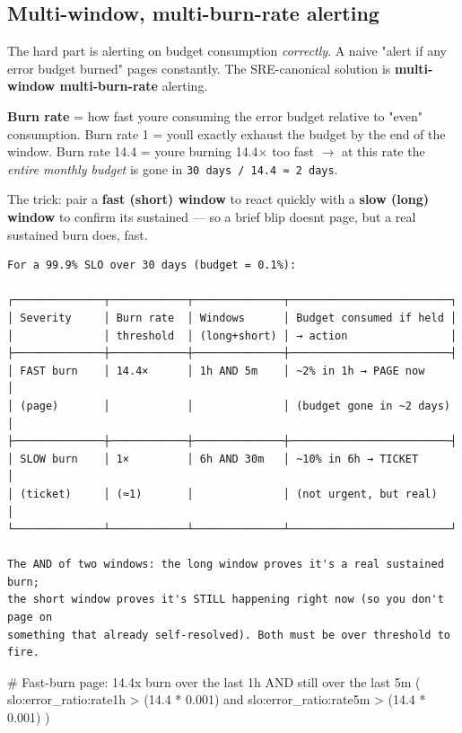 \documentclass[11pt]{article}
\newenvironment{Shaded}{\begin{snugshade}}{\end{snugshade}}
\newcommand{\NormalTok}[1]{\textcolor[rgb]{0.81,0.81,0.76}{#1}}
\begin{document}
\subsection{Multi-window, multi-burn-rate alerting}\label{multi-window-multi-burn-rate-alerting}

The hard part is alerting on budget consumption \emph{correctly}. A naive "alert if any error budget burned" pages constantly. The SRE-canonical solution is \textbf{multi-window multi-burn-rate} alerting.

\textbf{Burn rate} = how fast you\textquotesingle re consuming the error budget relative to "even" consumption. Burn rate 1 = you\textquotesingle ll exactly exhaust the budget by the end of the window. Burn rate 14.4 = you\textquotesingle re burning 14.4\(\times\) too fast \(\rightarrow\) at this rate the \emph{entire monthly budget} is gone in \texttt{30\ days\ /\ 14.4\ ≈\ 2\ days}.

The trick: pair a \textbf{fast (short) window} to react quickly with a \textbf{slow (long) window} to confirm it\textquotesingle s sustained --- so a brief blip doesn\textquotesingle t page, but a real sustained burn does, fast.

\setcodelang{}

\begin{verbatim}
For a 99.9% SLO over 30 days (budget = 0.1%):

┌──────────────┬────────────┬──────────────┬─────────────────────────┐
│ Severity     │ Burn rate  │ Windows      │ Budget consumed if held │
│              │ threshold  │ (long+short) │ → action                │
├──────────────┼────────────┼──────────────┼─────────────────────────┤
│ FAST burn    │ 14.4×      │ 1h AND 5m    │ ~2% in 1h → PAGE now     │
│ (page)       │            │              │ (budget gone in ~2 days) │
├──────────────┼────────────┼──────────────┼─────────────────────────┤
│ SLOW burn    │ 1×         │ 6h AND 30m   │ ~10% in 6h → TICKET      │
│ (ticket)     │ (≈1)       │              │ (not urgent, but real)   │
└──────────────┴────────────┴──────────────┴─────────────────────────┘

The AND of two windows: the long window proves it's a real sustained burn;
the short window proves it's STILL happening right now (so you don't page on
something that already self-resolved). Both must be over threshold to fire.
\end{verbatim}


\begin{Shaded}
\begin{Highlighting}[]
\NormalTok{\# Fast{-}burn page: 14.4x burn over the last 1h AND still over the last 5m}
\NormalTok{(}
\NormalTok{  slo:error\_ratio:rate1h  \textgreater{} (14.4 * 0.001)}
\NormalTok{  and}
\NormalTok{  slo:error\_ratio:rate5m  \textgreater{} (14.4 * 0.001)}
\NormalTok{)}
\end{Highlighting}
\end{Shaded}
\end{document}
